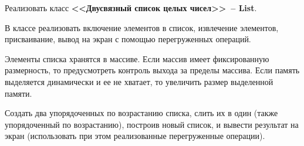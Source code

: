 
Реализовать класс \textbf{<<Двусвязный список целых чисел>>~-- List}.

В классе реализовать включение элементов в
список, извлечение элементов, присваивание, вывод на экран с помощью перегруженных
операций.

Элементы списка хранятся в массиве. Если массив имеет фиксированную
размерность, то предусмотреть контроль выхода за пределы массива. Если память
выделяется динамически и ее не хватает, то увеличить размер выделенной памяти.

Создать
два упорядоченных по возрастанию списка, слить их в один (также упорядоченный по
возрастанию), построив новый список, и вывести результат на экран (использовать при
этом реализованные перегруженные операции).

